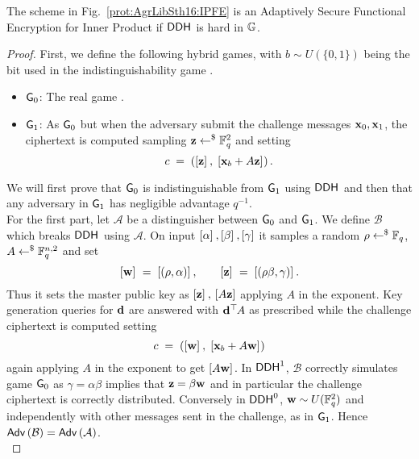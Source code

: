 \begin{proposition}
	\label{prop:AgrLibSth16:AS_IND_IPFE_DDH}
	The scheme in Fig.~\ref{prot:AgrLibSth16:IPFE} is an Adaptively Secure Functional Encryption for Inner Product if $\ddh$ is hard in $\G$.
\end{proposition}
\begin{proof}
	First, we define the following hybrid games, with $b \sim U(\{0, 1\})$ being the bit used in the indistinguishability game .
	\begin{itemize}
		\item $\cd{G}_0$: The real game .
		
		\item $\cd{G}_1$: As $\cd{G}_0$ but when the adversary submit the challenge messages $\vc{x}_0, \vc{x}_1$, the ciphertext is computed sampling $\vc{z} \rgets \F_q^2$ and setting
		\[
			c 
				\; = \; 
			\left( \gexp{}{\vc{z}}, \; \gexp{}{\vc{x}_b + A \vc{z}} \right).
		\]
	\end{itemize}
	We will first prove that $\cd{G}_0$ is indistinguishable from $\cd{G}_1$ using $\ddh$ and then that any adversary in $\cd{G}_1$ has negligible advantage $q^{-1}$.\\
	
	For the first part, let $\mathcal{A}$ be a distinguisher between $\cd{G}_0$ and $\cd{G}_1$. 
	We define $\mathcal{B}$ which breaks $\ddh$ using $\mathcal{A}$.
	On input $\gexp{}{\alpha}, \gexp{}{\beta}, \gexp{}{\gamma}$ it samples a random $\rho \rgets \F_q$, $A \rgets \F_q^{n, 2}$ and set
	\[
		\gexp{}{\vc{w}}
			\; = \;
		\gexp{}{(\rho, \alpha)}
			, \qquad
		\gexp{}{\vc{z}}
			\; = \;
		\gexp{}{(\rho\beta, \gamma)}.
	\]
	Thus it sets the master public key as $\gexp{}{\vc{z}}, \, \gexp{}{A \vc{z}}$ applying $A$ in the exponent.
	Key generation queries for $\vc{d}$ are answered with $\vc{d}^\trs A$ as prescribed while the challenge ciphertext is computed setting
	\[
		c 
			\; = \;
		\left( \gexp{}{\vc{w}}, \; \gexp{}{\vc{x}_b + A \vc{w}} \right)
	\]
	again applying $A$ in the exponent to get $\gexp{}{A \vc{w}}$.
	In $\ddh[1]$, $\mathcal{B}$ correctly simulates game $\cd{G}_0$ as $\gamma = \alpha \beta$ implies that $\vc{z} = \beta \vc{w}$ and in particular the challenge ciphertext is correctly distributed.
	Conversely in $\ddh[0]$, $\vc{w} \sim U(\F_q^2)$ and independently with other messages sent in the challenge, as in $\cd{G}_1$.
	Hence $\adv{\mathcal{B}} = \adv{\mathcal{A}}$.\\
	

\end{proof}
